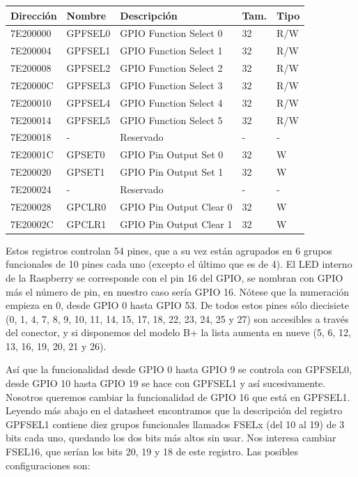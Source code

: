 \begin{longtable}{ p{1.8cm} | p{2cm} | p{5cm} | p{1cm} | p{1cm} }
\hline
{\bf Dirección} & {\bf Nombre} & {\bf Descripción} & {\bf Tam.} & {\bf Tipo} \\ \hline
7E200000 & GPFSEL0 & GPIO Function Select 0 & 32 & R/W \\ \hline
7E200004 & GPFSEL1 & GPIO Function Select 1 & 32 & R/W \\ \hline
7E200008 & GPFSEL2 & GPIO Function Select 2 & 32 & R/W \\ \hline
7E20000C & GPFSEL3 & GPIO Function Select 3 & 32 & R/W \\ \hline
7E200010 & GPFSEL4 & GPIO Function Select 4 & 32 & R/W \\ \hline
7E200014 & GPFSEL5 & GPIO Function Select 5 & 32 & R/W \\ \hline
7E200018 & -       & Reservado              & -  & -   \\ \hline
7E20001C & GPSET0  & GPIO Pin Output Set 0  & 32 & W   \\ \hline
7E200020 & GPSET1  & GPIO Pin Output Set 1  & 32 & W   \\ \hline
7E200024 & -       & Reservado              & -  & -   \\ \hline
7E200028 & GPCLR0  & GPIO Pin Output Clear 0 & 32 & W  \\ \hline
7E20002C & GPCLR1  & GPIO Pin Output Clear 1 & 32 & W  \\ \hline
\end{longtable}

Estos registros controlan 54 pines, que a su vez están agrupados
en 6 grupos funcionales de 10 pines cada uno (excepto el último
que es de 4). El LED interno de la
Raspberry se corresponde con el pin 16 del GPIO, se nombran con
GPIO más el número de pin, en nuestro caso sería GPIO 16. Nótese
que la numeración empieza en 0, desde GPIO 0 hasta GPIO 53. De
todos estos pines sólo diecisiete (0, 1, 4, 7, 8, 9, 10, 11, 14, 15, 17, 18, 22, 23, 24, 25 y 27)
son accesibles a través del conector, y si disponemos del modelo B+ la lista
aumenta en nueve (5, 6, 12, 13, 16, 19, 20, 21 y 26).

Así que la funcionalidad desde GPIO 0 hasta GPIO 9 se controla con
GPFSEL0, desde GPIO 10 hasta GPIO 19 se hace con GPFSEL1 y así
sucesivamente. Nosotros queremos cambiar la funcionalidad de GPIO 16
que está en GPFSEL1. Leyendo más abajo en el datasheet encontramos que
la descripción del registro GPFSEL1 contiene diez grupos funcionales
llamados FSELx (del 10 al 19) de 3 bits cada uno, quedando los dos bits
más altos sin usar. Nos interesa cambiar FSEL16, que serían los bits
20, 19 y 18 de este registro. Las posibles configuraciones son:

